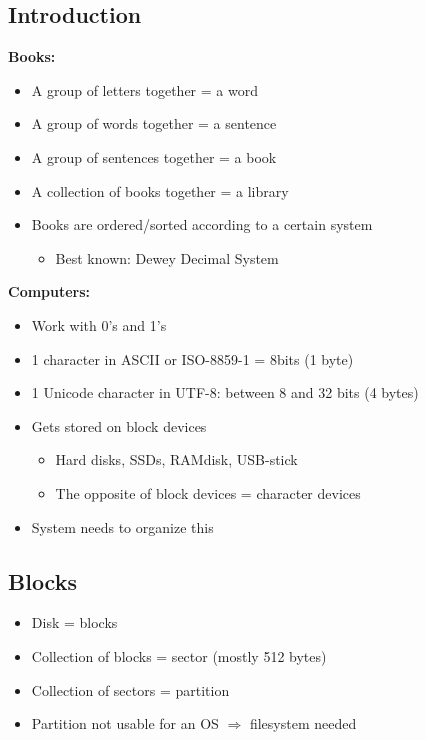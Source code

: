 \documentclass{article}
\begin{document}
\subsection{Introduction}

\textbf{Books:}

\begin{itemize}
    \item A group of letters together = a word
    \item A group of words together = a sentence
    \item A group of sentences together = a book
    \item A collection of books together = a library
    \item Books are ordered/sorted according to a certain system
    \begin{itemize}
        \item Best known: Dewey Decimal System
    \end{itemize}
\end{itemize}

\textbf{Computers:}

\begin{itemize}
    \item Work with 0's and 1's
    \item 1 character in ASCII or ISO-8859-1 = 8bits (1 byte)
    \item 1 Unicode character in UTF-8: between 8 and 32 bits (4 bytes)
    \item Gets stored on block devices
    \begin{itemize}
        \item Hard disks, SSDs, RAMdisk, USB-stick
        \item The opposite of block devices = character devices 
    \end{itemize}
    \item System needs to organize this
\end{itemize}

\subsection{Blocks}

\begin{itemize}
    \item Disk = blocks
    \item Collection of blocks = sector (mostly 512 bytes)
    \item Collection of sectors = partition
    \item Partition not usable for an OS $\Rightarrow$ filesystem needed
\end{itemize}
\end{document}
